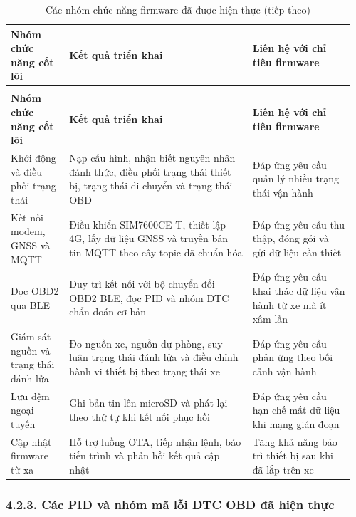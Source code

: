 \documentclass[a4paper]{extarticle}
\newcommand{\thesissettableid}[2]{%
  \renewcommand{\thetable}{#1}%
  \renewcommand{\theHtable}{#2}%
}
\begin{document}
{\thesissettableid{4.4}{condensed-bang-4-4-cac-nhom-chuc-nang-firmware-da-duoc-hien-thuc}
\def\LTcaptype{table}
\begin{longtable}{|L{0.168\linewidth}|L{0.508\linewidth}|L{0.282\linewidth}|}
\caption{Các nhóm chức năng firmware đã được hiện thực}\label{tab:condensed-bang-4-4-cac-nhom-chuc-nang-firmware-da-duoc-hien-thuc}\\
\hline
\textbf{Nhóm chức năng cốt lõi} & \textbf{Kết quả triển khai} & \textbf{Liên hệ với chỉ tiêu firmware} \\
\hline
\endfirsthead
\caption[]{Các nhóm chức năng firmware đã được hiện thực (tiếp theo)}\\
\hline
\textbf{Nhóm chức năng cốt lõi} & \textbf{Kết quả triển khai} & \textbf{Liên hệ với chỉ tiêu firmware} \\
\hline
\endhead
\endfoot
\endlastfoot
Khởi động và điều phối trạng thái & Nạp cấu hình, nhận biết nguyên nhân đánh thức, điều phối trạng thái thiết bị, trạng thái di chuyển và trạng thái OBD & Đáp ứng yêu cầu quản lý nhiều trạng thái vận hành \\\hline
Kết nối modem, GNSS và MQTT & Điều khiển SIM7600CE-T, thiết lập 4G, lấy dữ liệu GNSS và truyền bản tin MQTT theo cây topic đã chuẩn hóa & Đáp ứng yêu cầu thu thập, đóng gói và gửi dữ liệu cần thiết \\\hline
Đọc OBD2 qua BLE & Duy trì kết nối với bộ chuyển đổi OBD2 BLE, đọc PID và nhóm DTC chẩn đoán cơ bản & Đáp ứng yêu cầu khai thác dữ liệu vận hành từ xe mà ít xâm lấn \\\hline
Giám sát nguồn và trạng thái đánh lửa & Đo nguồn xe, nguồn dự phòng, suy luận trạng thái đánh lửa và điều chỉnh hành vi thiết bị theo trạng thái xe & Đáp ứng yêu cầu phản ứng theo bối cảnh vận hành \\\hline
Lưu đệm ngoại tuyến & Ghi bản tin lên microSD và phát lại theo thứ tự khi kết nối phục hồi & Đáp ứng yêu cầu hạn chế mất dữ liệu khi mạng gián đoạn \\\hline
Cập nhật firmware từ xa & Hỗ trợ luồng OTA, tiếp nhận lệnh, báo tiến trình và phản hồi kết quả cập nhật & Tăng khả năng bảo trì thiết bị sau khi đã lắp trên xe \\\hline
\end{longtable}
}

\subsubsection{4.2.3. Các PID và nhóm mã lỗi DTC OBD đã hiện thực}\label{cuxe1c-pid-vuxe0-nhuxf3m-muxe3-lux1ed7i-dtc-obd-ux111uxe3-hiux1ec7n-thux1ef1c}
\end{document}
